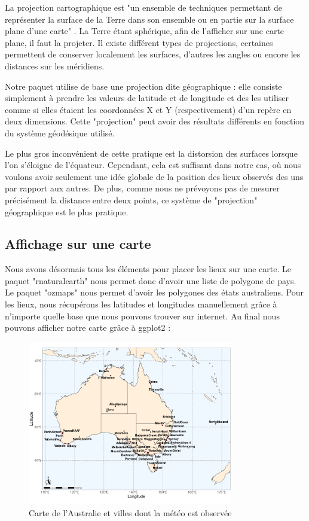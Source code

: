 \documentclass{article}
\begin{document}
La projection cartographique est "un ensemble de techniques permettant de représenter la surface de la Terre dans son ensemble ou en partie sur la surface plane d'une carte" \cite{frwiki:181713838}. La Terre étant sphérique, afin de l'afficher sur une carte plane, il faut la projeter. Il existe différent types de projections, certaines permettent de conserver localement les surfaces, d'autres les angles ou encore les distances sur les méridiens. 

Notre paquet utilise de base une projection dite géographique : elle consiste simplement à prendre les valeurs de latitude et de longitude et des les utiliser comme si elles étaient les coordonnées X et Y (respectivement) d'un repère en deux dimensions. Cette "projection" peut avoir des résultats différents en fonction du système géodésique utilisé. 

Le plus gros inconvénient de cette pratique est la distorsion des surfaces lorsque l'on s'éloigne de l'équateur. Cependant, cela est suffisant dans notre cas, où nous voulons avoir seulement une idée globale de la position des lieux observés des uns par rapport aux autres. De plus, comme nous ne prévoyons pas de mesurer précisément la distance entre deux points, ce système de "projection" géographique est le plus pratique.

\subsection{Affichage sur une carte}

Nous avons désormais tous les éléments pour placer les lieux sur une carte. Le paquet "rnaturalearth" nous permet donc d'avoir une liste de polygone de pays. Le paquet "ozmaps" nous permet d'avoir les polygones des états australiens. Pour les lieux, nous récupérons les latitudes et longitudes manuellement grâce à n'importe quelle base que nous pouvons trouver sur internet. Au final nous pouvons afficher notre carte grâce à ggplot2 : 

\begin{figure}[H]
    \centering
    \includegraphics[width=0.8\textwidth]{Ressources/Australia_full_map.png}
    \caption{Carte de l'Australie et villes dont la météo est observée}
\end{figure}
\end{document}
